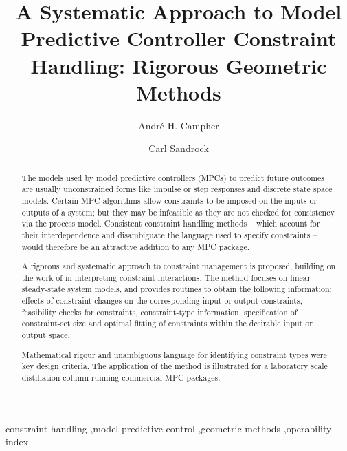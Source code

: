 \documentclass[final,authoryear,5pt,times,twocolumn]{elsarticle}
\begin{document}
\begin{frontmatter}

\title{A Systematic Approach to Model Predictive Controller Constraint Handling: Rigorous Geometric Methods}

\author{Andr\'e H. Campher}

\author{Carl Sandrock}


\address{Department of Chemical Engineering, University of Pretoria, Pretoria 0001, South Africa}

\begin{abstract}
The models used by model predictive controllers (MPCs) to predict future outcomes are usually unconstrained forms like impulse or step responses and discrete state space models. 
Certain MPC algorithms allow constraints  to be imposed on the inputs or outputs of a system; but they may be infeasible as they are not checked for consistency via the process model. 
Consistent constraint handling methods -- which account for their interdependence and disambiguate the language used to specify constraints -- would therefore be an attractive addition to any MPC package.

A rigorous and systematic approach to constraint management is proposed, building on the work of \citet{vinsonartoi} in interpreting constraint interactions. 
The method focuses on linear steady-state system models, and provides routines to obtain the following information: effects of constraint changes on the corresponding input or output constraints, feasibility checks for constraints, constraint-type information, specification of constraint-set size and optimal fitting of constraints within the desirable input or output space.

Mathematical rigour and unambiguous language for identifying constraint types were key design criteria. 
The application of the method is illustrated for a laboratory scale distillation column running commercial MPC packages.
\end{abstract}

\begin{keyword}
constraint handling \sep model predictive control \sep geometric methods \sep operability index
\end{keyword}

\end{frontmatter}
\end{document}
